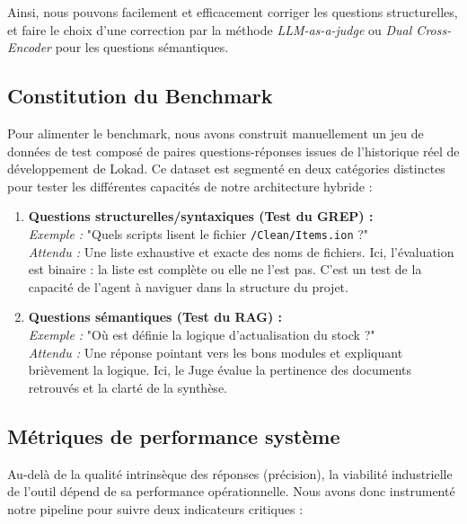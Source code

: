 Ainsi, nous pouvons facilement et efficacement corriger les questions structurelles, et faire le choix d'une correction par la méthode \textit{LLM-as-a-judge} ou \textit{Dual Cross-Encoder} pour les questions sémantiques.

\subsection{Constitution du Benchmark}
Pour alimenter le benchmark, nous avons construit manuellement un jeu de données de test composé de paires questions-réponses issues de l'historique réel de développement de Lokad. Ce dataset est segmenté en deux catégories distinctes pour tester les différentes capacités de notre architecture hybride :

\begin{enumerate}
    \item \textbf{Questions structurelles/syntaxiques (Test du GREP) :} 
    \\ \textit{Exemple :} "Quels scripts lisent le fichier \texttt{/Clean/Items.ion} ?" 
    \\ \textit{Attendu :} Une liste exhaustive et exacte des noms de fichiers. Ici, l'évaluation est binaire : la liste est complète ou elle ne l'est pas. C'est un test de la capacité de l'agent à naviguer dans la structure du projet.
    
    \item \textbf{Questions sémantiques (Test du RAG) :} 
    \\ \textit{Exemple :} "Où est définie la logique d'actualisation du stock ?" 
    \\ \textit{Attendu :} Une réponse pointant vers les bons modules et expliquant brièvement la logique. Ici, le Juge évalue la pertinence des documents retrouvés et la clarté de la synthèse.
\end{enumerate} 

\subsection{Métriques de performance système}

Au-delà de la qualité intrinsèque des réponses (précision), la viabilité industrielle de l'outil dépend de sa performance opérationnelle. Nous avons donc instrumenté notre pipeline pour suivre deux indicateurs critiques :

